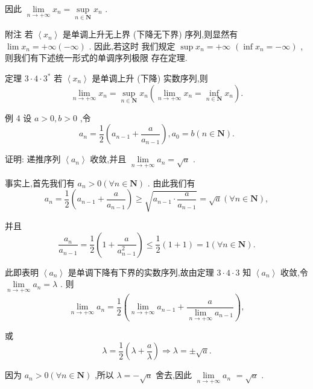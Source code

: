 因此 $\mathop{\lim }\limits_{{n \rightarrow   + \infty }}{x}_{n} = \mathop{\sup }\limits_{{n \in  \mathbf{N}}}{x}_{n}$ .

附注 若 $\left\langle  {x}_{n}\right\rangle$ 是单调上升无上界 (下降无下界) 序列,则显然有 $\lim {x}_{n} =  + \infty \left( {-\infty }\right)$ . 因此,若这时 我们规定 $\sup {x}_{n} =  + \infty$  $\left( {\inf {x}_{n} =  - \infty }\right)$ ,则我们有下述统一形式的单调序列极限 存在定理.

定理 $3 \cdot  4 \cdot  {3}^{ * }$ 若 $\left\langle  {x}_{n}\right\rangle$ 是单调上升 (下降) 实数序列,则
$$\mathop{\lim }\limits_{{n \rightarrow   + \infty }}{x}_{n} = \mathop{\sup }\limits_{{n \in  \mathbf{N}}}{x}_{n}\left( {\mathop{\lim }\limits_{{n \rightarrow   + \infty }}{x}_{n} = \mathop{\inf }\limits_{{n \in  \mathbf{N}}}{x}_{n}}\right) .$$

例 4 设 $a > 0,b > 0$ ,令
$${a}_{n} = \frac{1}{2}\left( {{a}_{n - 1} + \frac{a}{{a}_{n - 1}}}\right) ,{a}_{0} = b\left( {n \in  \mathbf{N}}\right) .$$

证明: 递推序列 $\left\langle  {a}_{n}\right\rangle$ 收敛,并且 $\mathop{\lim }\limits_{{n \rightarrow   + \infty }}{a}_{n} = \sqrt{a}$ .

事实上,首先我们有 ${a}_{n} > 0\left( {\forall n \in  \mathbf{N}}\right)$ . 由此我们有
$${a}_{n} = \frac{1}{2}\left( {{a}_{n - 1} + \frac{a}{{a}_{n - 1}}}\right)  \geq  \sqrt{{a}_{n - 1} \cdot  \frac{a}{{a}_{n - 1}}} = \sqrt{a}\left( {\forall n \in  \mathbf{N}}\right) ,$$

并且
$$\frac{{a}_{n}}{{a}_{n - 1}} = \frac{1}{2}\left( {1 + \frac{a}{{a}_{n - 1}^{2}}}\right)  \leq  \frac{1}{2}\left( {1 + 1}\right)  = 1\left( {\forall n \in  \mathbf{N}}\right) .$$

此即表明 $\left\langle  {a}_{n}\right\rangle$ 是单调下降有下界的实数序列,故由定理 $3 \cdot  4 \cdot  3$ 知 $\left\langle  {a}_{n}\right\rangle$ 收敛,令 $\mathop{\lim }\limits_{{n \rightarrow   + \infty }}{a}_{n} = \lambda$ . 则
$$\mathop{\lim }\limits_{{n \rightarrow   + \infty }}{a}_{n} = \frac{1}{2}\left( {\mathop{\lim }\limits_{{n \rightarrow   + \infty }}{a}_{n - 1} + \frac{a}{\mathop{\lim }\limits_{{n \rightarrow   + \infty }}{a}_{n - 1}}}\right) ,$$

或
$$\lambda  = \frac{1}{2}\left( {\lambda  + \frac{a}{\lambda }}\right)  \Rightarrow  \lambda  =  \pm  \sqrt{a}.$$

因为 ${a}_{n} > 0\left( {\forall n \in  \mathbf{N}}\right)$ ,所以 $\lambda  =  - \sqrt{a}$ 舍去,因此 $\mathop{\lim }\limits_{{n \rightarrow   + \infty }}{a}_{n}$  $= \sqrt{a}$ .

